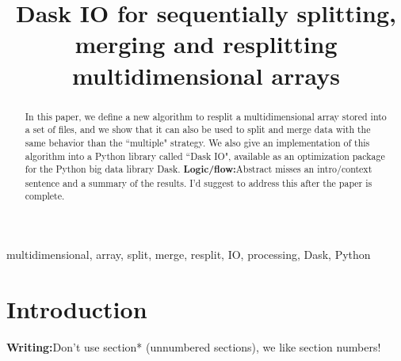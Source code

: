 \documentclass[conference]{IEEEtran}
\newcommand{\logic}[1]{\color{red}\textbf{Logic/flow:}#1\color{black}}
\newcommand{\writing}[1]{\color{green}\textbf{Writing:}#1\color{black}}
\begin{document}
\title{ Dask IO for sequentially splitting, merging and resplitting multidimensional arrays }

\author{
}

\maketitle

\begin{abstract}
In this paper, we define a new algorithm to resplit a multidimensional
array stored into a set of files, and we show that it can also be used to
split and merge data with the same behavior than the ``multiple" strategy.
We also give an implementation of this algorithm into a Python library
called ``Dask IO", available as an optimization package for the Python big
data library Dask.
\logic{Abstract misses an intro/context sentence and a summary of the results.
I'd suggest to address this after the paper is complete.}
\end{abstract}

\begin{IEEEkeywords}
multidimensional, array, split, merge, resplit, IO, processing, Dask, Python
\end{IEEEkeywords}



\section{Introduction}

\writing{Don't use section* (unnumbered sections), we like section numbers!}
\end{document}
